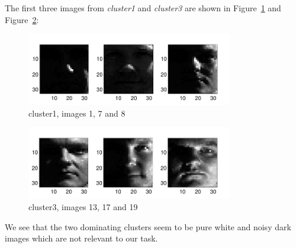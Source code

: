 \documentclass[a4paper]{article}
\begin{document}
\clearpage

The first three images from {\it cluster1} and {\it cluster3} are shown in Figure~\ref{fig:a2img5} and Figure~\ref{fig:a2img6}:

\begin{figure}[!htbp]
\centering
\includegraphics[width=0.8\textwidth]{A2-img5-cluster1-cropped.pdf}
\caption{cluster1, images 1, 7 and 8}
\label{fig:a2img5}
\end{figure}

\begin{figure}[!htbp]
\centering
\includegraphics[width=0.8\textwidth]{A2-img6-cluster3-cropped.pdf}
\caption{cluster3, images 13, 17 and 19}
\label{fig:a2img6}
\end{figure}

We see that the two dominating clusters seem to be pure white and noisy dark images which are not relevant to our task.


\end{document}
